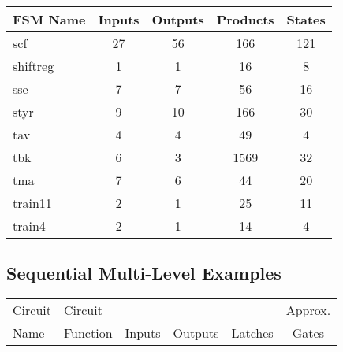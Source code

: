 {\begin{pespace}
\begin{center}
\begin{tabular}{|l|c|c|c|c|}
\hline
FSM Name  &     Inputs   &  Outputs &   Products   &  States\\
\hline
scf        &        27   &      56    &     166    &    121\\
shiftreg   &         1   &       1    &      16    &      8\\
sse        &         7   &       7    &      56    &     16\\
styr       &         9   &      10    &     166    &     30\\
tav        &         4   &       4    &      49    &      4\\
tbk        &         6   &       3    &    1569    &     32\\
tma        &         7   &       6    &      44    &     20\\
train11    &         2   &       1    &      25    &     11\\
train4     &         2   &       1    &      14    &      4\\
\hline
\end{tabular}
\end{center}


\subsection{Sequential Multi-Level Examples}

\vspace*{.5in}

\begin{center}


\begin{tabular}{|l|l|c|c|c|c|} \hline

Circuit & Circuit          &        &         &       & Approx.      \\
Name    & Function         & Inputs & Outputs& Latches& Gates \\ \hline


\end{tabular}
\end{center}
\end{pespace}}

